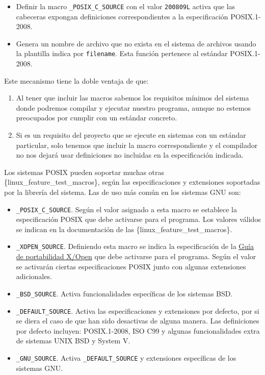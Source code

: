 \begin{itemize}
\item
  Definir la macro \texttt{\_POSIX\_C\_SOURCE} con el valor
  \texttt{200809L} activa que las cabeceras expongan definiciones
  correspondientes a la especificación POSIX.1-2008.
\item
  Genera un nombre de archivo que no exista en el sistema de archivos
  usando la plantilla indica por \texttt{filename}. Esta función
  pertenece al estándar POSIX.1-2008.
\end{itemize}

Este mecanismo tiene la doble ventaja de que:

\begin{enumerate}
\def\labelenumi{\arabic{enumi}.}
\item
  Al tener que incluir las macros sabemos los requisitos mínimos del
  sistema donde podremos compilar y ejecutar nuestro programa, aunque no
  estemos preocupados por cumplir con un estándar concreto.
\item
  Si es un requisito del proyecto que se ejecute en sistemas con un
  estándar particular, solo tenemos que incluir la macro correspondiente
  y el compilador no nos dejará usar definiciones no incluidas en la
  especificación indicada.
\end{enumerate}

Los sistemas POSIX pueden soportar muchas otras
\{linux\_feature\_test\_macros\}, según las especificaciones y
extensiones soportadas por la librería del sistema. Las de uso más común
en los sistemas GNU son:

\begin{itemize}
\item
  \texttt{\_POSIX\_C\_SOURCE}. Según el valor asignado a esta macro se
  establece la especificación POSIX que debe activarse para el programa.
  Los valores válidos se indican en la documentación de las
  \{linux\_feature\_test\_macros\}.
\item
  \texttt{\_XOPEN\_SOURCE}. Definiendo esta macro se indica la
  especificación de la \href{https://es.wikipedia.org/wiki/X/Open}{Guía
  de portabilidad X/Open} que debe activarse para el programa. Según el
  valor se activarán ciertas especificaciones POSIX junto con algunas
  extensiones adicionales.
\item
  \texttt{\_BSD\_SOURCE}. Activa funcionalidades específicas de los
  sistemas BSD.
\item
  \texttt{\_DEFAULT\_SOURCE}. Activa las especificaciones y extensiones
  por defecto, por si se diera el caso de que han sido desactivas de
  alguna manera. Las definiciones por defecto incluyen: POSIX.1-2008,
  ISO C99 y algunas funcionalidades extra de sistemas UNIX BSD y System
  V.
\item
  \texttt{\_GNU\_SOURCE}. Activa \texttt{\_DEFAULT\_SOURCE} y
  extensiones específicas de los sistemas GNU.
\end{itemize}

